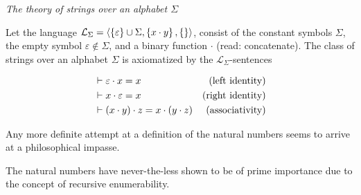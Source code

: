 \begin{definition} \emph{The theory of strings over an alphabet $\Sigma$}

Let the language
$\mathcal{L}_\Sigma=\left\langle{\ensuremath{\left\{{\varepsilon}\right\}}\cup\Sigma,\ensuremath{\left\{{x\cdot y}\right\}},\ensuremath{\left\{{}\right\}}}\right\rangle$,
consist of the constant symbols $\Sigma$, the empty symbol $\varepsilon \notin
\Sigma$, and a binary function $\cdot$ (read: concatenate). The class of
strings over an alphabet $\Sigma$ is axiomatized by the
$\mathcal{L}_\Sigma$-sentences

\begin{align}
&\vdash \varepsilon \cdot x = x & \text{(left identity)} \\
&\vdash x \cdot \varepsilon = x & \text{(right identity)} \\
&\vdash \left({ x \cdot y }\right) \cdot z = x \cdot \left({ y \cdot z }\right) & \text{(associativity)}
\end{align}

\end{definition}






Any more definite attempt at a definition of the natural numbers seems to
arrive at a philosophical impasse.

The natural numbers have never-the-less shown to be of prime importance due to
the concept of recursive enumerability.

